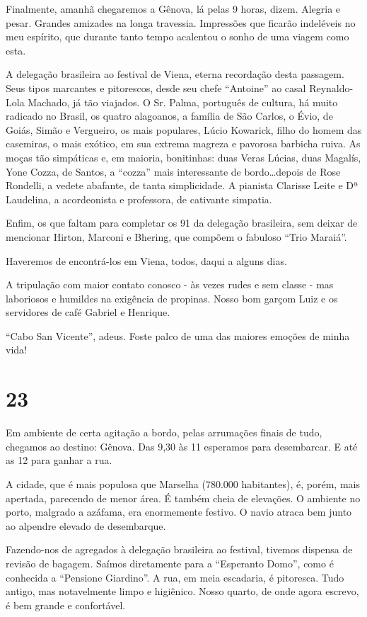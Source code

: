 Finalmente, amanhã chegaremos a Gênova, lá pelas 9 horas, dizem. Alegria e pesar. Grandes amizades na longa travessia. Impressões que ficarão indeléveis no meu espírito, que durante tanto tempo acalentou o sonho de uma viagem como esta.

A delegação brasileira ao festival de Viena, eterna recordação desta passagem. Seus tipos marcantes e pitorescos, desde seu chefe “Antoine” ao casal Reynaldo-Lola Machado, já tão viajados. O Sr. Palma, português de cultura, há muito radicado no Brasil, os quatro alagoanos, a família de São Carlos, o Évio, de Goiás, Simão e Vergueiro, os mais populares, Lúcio Kowarick, filho do homem das casemiras, o mais exótico, em sua extrema magreza e pavorosa barbicha ruiva. As moças tão simpáticas e, em maioria, bonitinhas: duas Veras Lúcias, duas Magalís, Yone Cozza, de Santos, a “cozza” mais interessante de bordo\ldots depois de Rose Rondelli, a vedete abafante, de tanta simplicidade. A pianista Clarisse Leite e Dª Laudelina, a acordeonista e professora, de cativante simpatia.

Enfim, os que faltam para completar os 91 da delegação brasileira, sem deixar de mencionar Hirton, Marconi e Bhering, que compõem o fabuloso “Trio Maraiá”.

Haveremos de encontrá-los em Viena, todos, daqui a alguns dias.

A tripulação com maior contato conosco - às vezes rudes e sem classe - mas laboriosos e humildes na exigência de propinas. Nosso bom garçom Luiz e os servidores de café Gabriel e Henrique.

“Cabo San Vicente”, adeus. Foste palco de uma das maiores emoções de minha vida!

\section*{23 \adfflatleafright {}}
Em ambiente de certa agitação a bordo, pelas arrumações finais de tudo, chegamos ao destino: Gênova. Das 9,30 às 11 esperamos para desembarcar. E até as 12 para ganhar a rua.

A cidade, que é mais populosa que Marselha (780.000 habitantes), é, porém, mais apertada, parecendo de menor área. É também cheia de elevações. O ambiente no porto, malgrado a azáfama, era enormemente festivo. O navio atraca bem junto ao alpendre elevado de desembarque.

Fazendo-nos de agregados à delegação brasileira ao festival, tivemos dispensa de revisão de bagagem. Saímos diretamente para a “Esperanto Domo”, como é conhecida a “Pensione Giardino”. A rua, em meia escadaria, é pitoresca. Tudo antigo, mas notavelmente limpo e higiênico. Nosso quarto, de onde agora escrevo, é bem grande e confortável.

